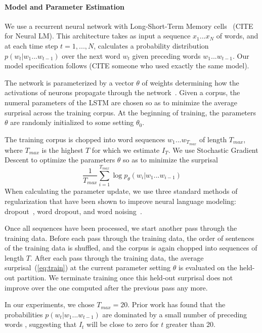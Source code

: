 \paragraph{Model and Parameter Estimation}
We use a recurrent neural network with Long-Short-Term Memory cells~\citep{hochreiter-long-1997} (CITE for Neural LM).
This architecture takes as input a sequence $x_1 ... x_N$ of words, and at each time step $t=1, ..., N$, calculates a probability distribution $p(w_t|w_1...w_{t-1})$ over the next word $w_{t}$ given preceding words $w_1 ... w_{t-1}$.
Our model specification follows (CITE someone who used exactly the same model).

The network is parameterized by a vector $\theta$ of weights determining how the activations of neurons propagate through the network~\citep{hochreiter-long-1997}.
Given a corpus, the numeral parameters of the LSTM are chosen so as to minimize the average surprisal across the training corpus.
At the beginning of training, the parameters $\theta$ are randomly initialized to some setting $\theta_0$.

The training corpus is chopped into word sequences $w_1 ... w_{T_{max}}$ of length ${T_{max}}$, where ${T_{max}}$ is the highest $T$ for which we estimate $I_T$. %
We use Stochastic Gradient Descent to optimize the parameters $\theta$ so as to minimize the surprisal
\begin{equation}\label{eq:train}
	\frac{1}{T_{max}} \sum_{i=1}^{T_{max}} \log p_\theta(w_i|w_1...w_{i-1})
\end{equation}
When calculating the parameter update, we use three standard methods of regularization that have been shown to improve neural language modeling: dropout~\citep{srivastava-dropout:-2014}, word dropout, and word noising~\citep{xie2017data}.

Once all sequences have been processed, we start another pass through the training data.
Before each pass through the training data, the order of sentences of the training data is shuffled, and the corpus is again chopped into sequences of length $T$.
After each pass through the training data, the average surprisal~(\ref{eq:train}) at the current parameter setting $\theta$ is evaluated on the held-out partition.
We terminate training once this held-out  surprisal does not improve over the one computed after the previous pass any more.

In our experiments, we chose $T_{max} = 20$. Prior work has found that the probabilities $p(w_t|w_1...w_{t-1})$ are dominated by a small number of preceding words \citep{daniluk2017frustratingly}, suggesting that $I_t$ will be close to zero for $t$ greater than 20.



